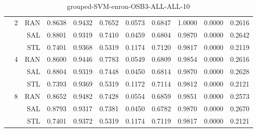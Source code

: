 \begin{center}
\begin{table}[htbp]
\begin{center}
\begin{tabular}{ | r | r | r | r | r | r | r | r | r | r | r |}
 & \multirow{3}{*}{2} & RAN & 0.8638 & 0.9432 & 0.7652 & 0.0573 & 0.6847 & 1.0000 & 0.0000 & 0.2616\\ \cline{3-11}
 &   & SAL & 0.8801 & 0.9319 & 0.7410 & 0.0459 & 0.6804 & 0.9870 & 0.0000 & 0.2642\\ \cline{3-11}
 &   & STL & 0.7401 & 0.9368 & 0.5319 & 0.1174 & 0.7120 & 0.9817 & 0.0000 & 0.2119\\ \cline{2-11}
 & \multirow{3}{*}{4} & RAN & 0.8600 & 0.9446 & 0.7783 & 0.0549 & 0.6809 & 0.9854 & 0.0000 & 0.2616\\ \cline{3-11}
 &   & SAL & 0.8804 & 0.9319 & 0.7448 & 0.0450 & 0.6814 & 0.9870 & 0.0000 & 0.2628\\ \cline{3-11}
 &   & STL & 0.7393 & 0.9369 & 0.5319 & 0.1172 & 0.7114 & 0.9812 & 0.0000 & 0.2121\\ \cline{2-11}
 & \multirow{3}{*}{8} & RAN & 0.8652 & 0.9482 & 0.7428 & 0.0554 & 0.6859 & 0.9851 & 0.0000 & 0.2573\\ \cline{3-11}
 &   & SAL & 0.8793 & 0.9317 & 0.7381 & 0.0450 & 0.6782 & 0.9870 & 0.0000 & 0.2670\\ \cline{3-11}
 &   & STL & 0.7401 & 0.9372 & 0.5319 & 0.1174 & 0.7119 & 0.9817 & 0.0000 & 0.2121\\ \cline{2-11}
\hline
\end{tabular}
\caption{grouped-SVM-enron-OSB3-ALL-ALL-10}
\end{center}
 \end{table}
\end{center}

